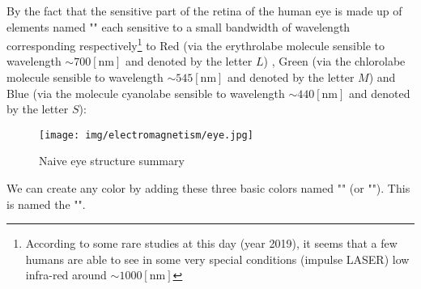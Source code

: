 	By the fact that the sensitive part of the retina of the human eye is made up of elements named "" each sensitive to a small bandwidth of wavelength corresponding respectively\footnote{According to some rare studies at this day (year 2019), it seems that a few humans are able to see in some very special conditions (impulse LASER) low infra-red around  $\sim 1000 [\text{nm}]$} to Red (via the erythrolabe molecule sensible to wavelength $\sim 700 [\text{nm}]$ and denoted by the letter $L$) , Green (via the chlorolabe molecule sensible to wavelength $\sim 545 [\text{nm}]$ and denoted by the letter $M$) and Blue (via the molecule cyanolabe sensible to wavelength $\sim 440 [\text{nm}]$ and denoted by the letter $S$): 
	\begin{figure}[H]
		\centering
		\texttt{[image: img/electromagnetism/eye.jpg]}
		\caption{Naive eye structure summary}
	\end{figure}
	We can create any color by adding these three basic colors named "" (or ""). This is named the "".
	
